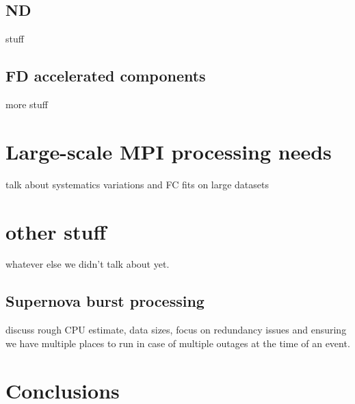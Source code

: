\documentclass{article}
\begin{document}
\subsection{ND}\label{sub:ND}
stuff
\subsection{FD accelerated components\label{sub:FD}}
more stuff

\section{Large-scale MPI processing needs\label{sec:mpi}}
talk about systematics variations and FC fits on large datasets

\section{other stuff\label{sec:other}}
whatever else we didn't talk about yet.
\subsection{Supernova burst processing\label{sub:sn}}
discuss rough CPU estimate, data sizes, focus on redundancy issues and ensuring we have multiple places to run in case of multiple outages at the time of an event.


\section{Conclusions}\label{sec:conc}
\end{document}
